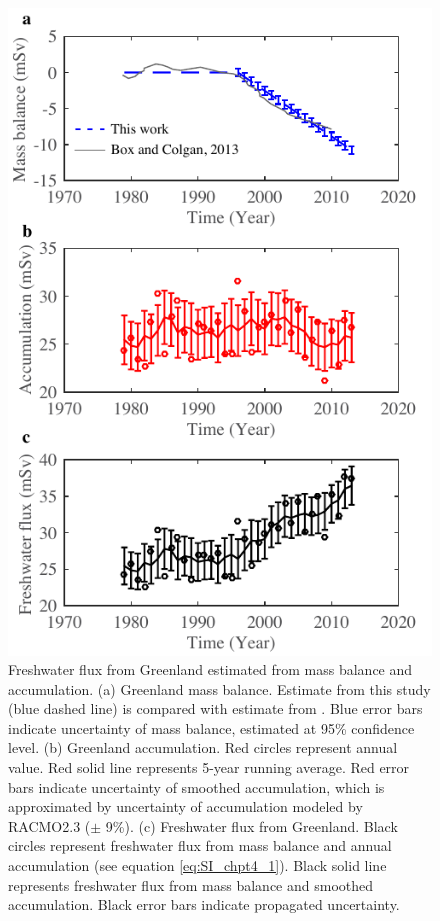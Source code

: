 \begin{figure}
	\centering
	\includegraphics{figs_app/FigS3.pdf}
	\caption[Freshwater flux from Greenland estimated from mass balance and accumulation.  (a) Greenland mass balance.]{Freshwater flux from Greenland estimated from mass balance and accumulation.  (a) Greenland mass balance. Estimate from this study (blue dashed line) is compared with estimate from \citet{box2013greenland}. Blue error bars indicate uncertainty of mass balance, estimated at 95\% confidence level. (b) Greenland accumulation.  Red circles represent annual value.  Red solid line represents 5-year running average.  Red error bars indicate uncertainty of smoothed accumulation, which is approximated by uncertainty of accumulation modeled by RACMO2.3 ($\pm$ 9\%).  (c) Freshwater flux from Greenland.  Black circles represent freshwater flux from mass balance and annual accumulation (see equation \ref{eq:SI_chpt4_1}).  Black solid line represents freshwater flux from mass balance and smoothed accumulation.  Black error bars indicate propagated uncertainty.}
	\label{fig:SI4_fig3}
\end{figure}

